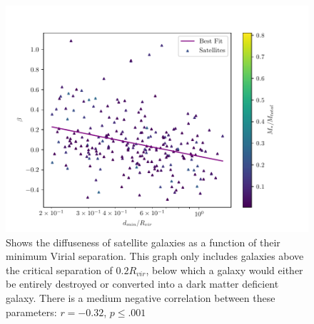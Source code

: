 \begin{figure}
    \centering
    \includegraphics*[width=\textwidth*2/3]{figs/me/beta-dmin-fit.pdf}
    \caption{Shows the diffuseness of satellite galaxies as a function of their minimum Virial separation. This graph only includes galaxies above the critical separation of $0.2 R_{vir}$, below which a galaxy would either be entirely destroyed or converted into a dark matter deficient galaxy. There is a medium negative correlation between these parameters: $r=-0.32$, $p \leq .001$}
    \label{fig:beta-dmin-fit}
\end{figure}